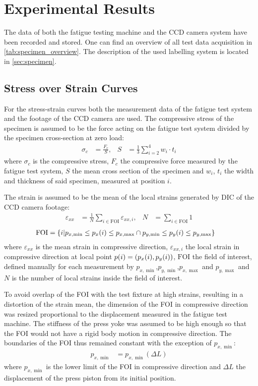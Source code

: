 \chapter{Experimental Results}
\label{chap:\currfilebase}

The data of both the fatigue testing machine and the CCD camera system have been recorded and stored. One can find an overview of all test data acquisition in \autoref{tab:specimen_overview}. The description of the used labelling system is located in \autoref{sec:specimen}.

\section{Stress over Strain Curves}
\label{sec:stress_strain_curves}

For the stress-strain curves both the measurement data of the fatigue test system and the footage of the CCD camera are used. The compressive stress of the specimen is assumed to be the force acting on the fatigue test system divided by the specimen cross-section at zero load:
\begin{align*}
    \sigma_c &= \frac{F_{c}}{S}, &S &= \frac{1}{3}\sum\limits_{i=2}^4 w_i\cdot t_i
\end{align*}
where $\sigma_c$ is the compressive stress, $F_c$ the compressive force measured by the fatigue test system, $S$ the mean cross section of the specimen and $w_i$, $t_i$ the width and thickness of said specimen, measured at position $i$.

The strain is assumed to be the mean of the local strains generated by DIC of the CCD camera footage:
\begin{align*}
    \varepsilon_{xx} &= \frac{1}{N}\sum\limits_{i\in\text{FOI}}\varepsilon_{xx,i}, &N &= \sum\limits_{i\in\text{FOI}}1
\end{align*}
\begin{align*}
    \text{FOI} &= \Bqty{i|p_{x,\min}\leq p_x(i)\leq p_{x,\max} \cap p_{y,\min}\leq p_y(i)\leq p_{y,\max}}
\end{align*}
where $\varepsilon_{xx}$ is the mean strain in compressive direction, $\varepsilon_{xx,i}$ the local strain in compressive direction at local point $p(i)=\pqty{p_x(i),p_y(i)}$, $\text{FOI}$ the field of interest, defined manually for each measurement by $p_{x,\min}$,$p_{y,\min}$,$p_{x,\max}$ and $p_{y,\max}$ and $N$ is the number of local strains inside the field of interest.

To avoid overlap of the FOI with the test fixture at high strains, resulting in a distortion of the strain mean, the dimension of the FOI in compressive direction was resized proportional to the displacement measured in the fatigue test machine. The stiffness of the press yoke was assumed to be high enough so that the FOI would not have a rigid body motion in compressive direction. The boundaries of the FOI thus remained constant with the exception of $p_{x,\min}$:
\begin{align*}
    p_{x,\min} &= p_{x,\min}(\Delta L)
\end{align*}
where $p_{x,\min}$ is the lower limit of the FOI in compressive direction and $\Delta L$ the displacement of the press piston from its initial position.

